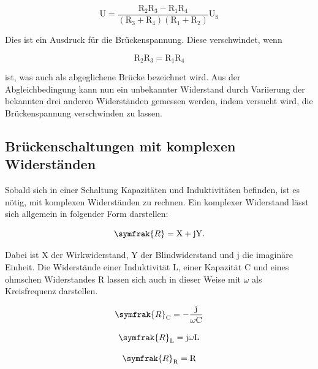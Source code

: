 \begin{equation}
\text{U} = \frac{\text{R}_2 \text{R}_3 - \text{R}_1 \text{R}_4}{(\text{R}_3 + \text{R}_4)(\text{R}_1 + \text{R}_2)} \text{U}_\text{S}
\label{eqn:ub}
\end{equation}

\noindent
Dies ist ein Ausdruck für die Brückenspannung. 
Diese verschwindet, wenn

\begin{equation}
\text{R}_2 \text{R}_3 = \text{R}_1 \text{R}_4
\label{eqn:abgleichbed}
\end{equation}

\noindent
ist, was auch als abgeglichene Brücke bezeichnet wird.
Aus der Abgleichbedingung kann nun ein unbekannter Widerstand durch Variierung der bekannten drei anderen Widerständen gemessen werden,
indem versucht wird, die Brückenspannung verschwinden zu lassen. 

\newpage
\subsection{Brückenschaltungen mit komplexen Widerständen}

\noindent
Sobald sich in einer Schaltung Kapazitäten und Induktivitäten befinden, ist es nötig, mit komplexen Widerständen zu rechnen.
Ein komplexer Widerstand lässt sich allgemein in folgender Form darstellen:

\begin{equation}
\symfrak{R} = \text{X} + \text{jY}  .
\label{eqn:rkomplex}
\end{equation}

\noindent
Dabei ist X der Wirkwiderstand, Y der Blindwiderstand und j die imaginäre Einheit.
Die Widerstände einer Induktivität L, einer Kapazität C und eines ohmschen Widerstandes R lassen sich auch in dieser Weise mit $\omega$ als Kreisfrequenz darstellen.

\begin{equation}
\symfrak{R}_\text{C} = -\frac{\text{j}}{\omega \text{C}}
\label{eqn:r_c}
\end{equation}

\begin{equation}
\symfrak{R}_\text{L} = \text{j}\omega\text{L}
\label{eqn:r_l}
\end{equation}

\begin{equation}
\symfrak{R}_\text{R} = \text{R}
\label{eqn:r_r}
\end{equation}

